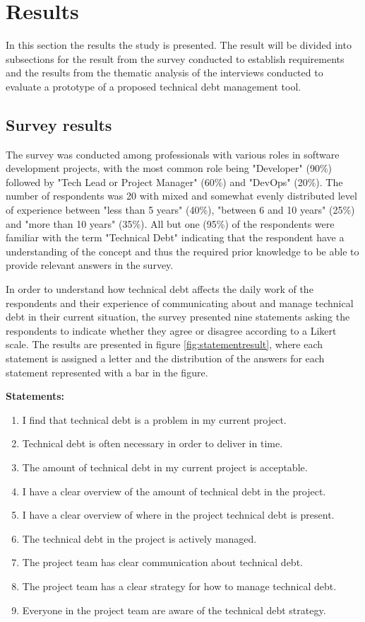 

\section{Results}
In this section the results the study is presented.
The result will be divided into subsections for the result from the survey conducted to establish requirements and the results from the thematic analysis of the interviews conducted to evaluate a prototype of a proposed technical debt management tool.

\subsection{Survey results}
The survey was conducted among professionals with various roles in software development projects, with the most common role being "Developer" (90\%) followed by "Tech Lead or Project Manager" (60\%) and "DevOps" (20\%).
The number of respondents was 20 with mixed and somewhat evenly distributed level of experience between "less than 5 years" (40\%), "between 6 and 10 years" (25\%) and "more than 10 years" (35\%).
All but one (95\%) of the respondents were familiar with the term "Technical Debt" indicating that the respondent have a understanding of the concept and thus the required prior knowledge to be able to provide relevant answers in the survey.

In order to understand how technical debt affects the daily work of the respondents and their experience of communicating about and manage technical debt in their current situation, the survey presented nine statements asking the respondents to indicate whether they agree or disagree according to a Likert scale. %
The results are presented in figure \ref{fig:statementresult}, where each statement is assigned a letter and the distribution of the answers for each statement represented with a bar in the figure.

\smallskip
\textbf{Statements:}
\begin{enumerate}[label=\alph*)]
  \item I find that technical debt is a problem in my current project.
  \item Technical debt is often necessary in order to deliver in time.
  \item The amount of technical debt in my current project is acceptable.
  \item I have a clear overview of the amount of technical debt in the project.
  \item I have a clear overview of where in the project technical debt is present.
  \item The technical debt in the project is actively managed.
  \item The project team has clear communication about technical debt.
  \item The project team has a clear strategy for how to manage technical debt.
  \item Everyone in the project team are aware of the technical debt strategy.
\end{enumerate}
\smallskip

